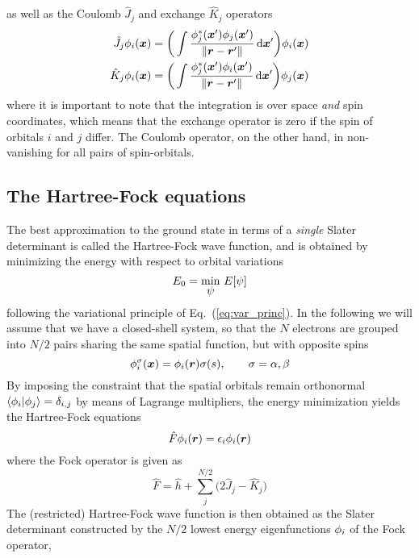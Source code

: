 as well as the Coulomb $\hat{J}_j$ and exchange $\hat{K}_j$ operators
\begin{align}
    \hat{J}_j \phi_i(\boldsymbol x) &= \bigg(\int \frac{\phi_j^{\ast}(\boldsymbol x')\phi_j(\boldsymbol x')}
	{\|\boldsymbol r-\boldsymbol r'\|}\,\mathrm{d}\boldsymbol x'\bigg) \phi_i(\boldsymbol x)\\
    \hat{K}_j \phi_i(\boldsymbol x) &= \bigg(\int \frac{\phi_j^{\ast}(\boldsymbol x')\phi_i(\boldsymbol x')}
	{\|\boldsymbol r-\boldsymbol r'\|}\,\mathrm{d}\boldsymbol x'\bigg) \phi_j(\boldsymbol x)
\end{align}
where it is important to note that the integration is over space \emph{and} spin coordinates,
which means that the exchange operator is zero if the spin of orbitals $i$ and $j$ differ. 
The Coulomb operator, on the other hand, in non-vanishing for all pairs of spin-orbitals.

\subsection{The Hartree-Fock equations}
The best approximation to the ground state in terms of a \emph{single} Slater determinant is 
called the Hartree-Fock wave function, and is obtained by minimizing the energy with respect 
to orbital variations
\begin{equation}
    E_0 = \underset{\hbox{\ensuremath{\psi}}}{\text{min}}\ E[\psi]
\end{equation}
following the variational principle of Eq.~(\ref{eq:var_princ}). 
In the following we will assume that we have a closed-shell system, so that the $N$ electrons
are grouped into $N/2$ pairs sharing the same spatial function, but with opposite spins
\begin{equation}
    \phi_i^\sigma(\boldsymbol x) = \phi_i(\boldsymbol r)\sigma(s), \qquad \sigma = \alpha,\beta
\end{equation}
By imposing the constraint that the spatial orbitals remain orthonormal 
$\langle\phi_i|\phi_j\rangle = \delta_{i,j}$
by means of Lagrange multipliers, the energy minimization yields the Hartree-Fock equations
\begin{equation}
    \hat{F}\phi_i(\boldsymbol r) = \epsilon_i \phi_i(\boldsymbol r)
\end{equation}
where the Fock operator is given as
\begin{equation}
    \hat{F} = \hat{h} + \sum_j^{N/2} \Big(2\hat{J}_j - \hat{K}_j\Big)
\end{equation}
The (restricted) Hartree-Fock wave function is then obtained as the Slater determinant 
constructed by the $N/2$ lowest energy eigenfunctions $\phi_i$ of the Fock operator, 
